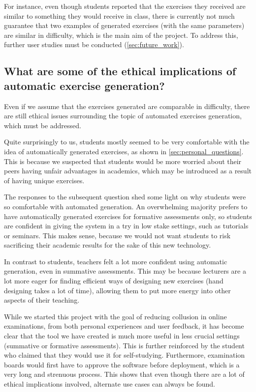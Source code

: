 \documentclass{l4proj}
\begin{document}
For instance, even though students reported that the exercises they received are similar to something they would receive in class, there is currently not much guarantee that two examples of generated exercises (with the same parameters) are similar in difficulty, which is the main aim of the project. To address this, further user studies must be conducted (\autoref{sec:future_work}).

\subsection*{What are some of the ethical implications of automatic exercise generation?}

Even if we assume that the exercises generated are comparable in difficulty, there are still ethical issues surrounding the topic of automated exercises generation, which must be addressed.

Quite surprisingly to us, students mostly seemed to be very comfortable with the idea of automatically generated exercises, as shown in \autoref{sec:personal_questions}. This is because we suspected that students would be more worried about their peers having unfair advantages in academics, which may be introduced as a result of having unique exercises. 

The responses to the subsequent question shed some light on why students were so comfortable with automated generation. An overwhelming majority prefers to have automatically generated exercises for formative assessments only, so students are confident in giving the system in a try in low stake settings, such as tutorials or seminars. This makes sense, because we would not want students to risk sacrificing their academic results for the sake of this new technology.

In contrast to students, teachers felt a lot more confident using automatic generation, even in summative assessments. This may be because lecturers are a lot more eager for finding efficient ways of designing new exercises (hand designing takes a lot of time), allowing them to put more energy into other aspects of their teaching.

While we started this project with the goal of reducing collusion in online examinations, from both personal experiences and user feedback, it has become clear that the tool we have created is much more useful in less crucial settings (summative or formative assessments). This is further reinforced by the student who claimed that they would use it for self-studying. Furthermore, examination boards would first have to approve the software before deployment, which is a very long and strenuous process. This shows that even though there are a lot of ethical implications involved, alternate use cases can always be found.
\end{document}
